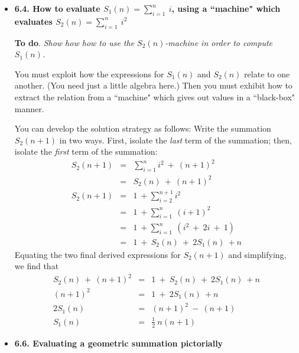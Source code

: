 \begin{itemize}
\item
{\bf 6.4. How to evaluate $S_1(n) = \sum_{i=1}^n \ i$, using a ``machine" which evaluates $S_2(n) = \sum_{i=1}^n \ i^2$}
\smallskip

{\bf To do}. {\em Show how how to use the $S_2(n)$-machine in order to compute $S_1(n)$.}

\medskip

You must exploit how the expressions for $S_1(n)$ and $S_2(n)$ relate to one another.  (You need just a little algebra here.)  Then you must exhibit how to extract the relation from a ``machine" which gives out values in a ``black-box" manner.

\smallskip

You can develop the solution strategy as follows:  
Write the summation $S_2(n+1)$ in two ways.  First, isolate the {\em last} term of the summation; then, isolate the {\em first} term of the summation:
\begin{eqnarray*}
S_2(n+1) & = &  \sum_{i=1}^{n} i^2 \ + \ (n+1)^2  \\
                & = & S_2(n) \ + \ (n+1)^2 \\
S_2(n+1) & = & 1 \ + \sum_{i=2}^{n+1} i^2 \\
                & = & 1 \ + \sum_{i=1}^{n} \ (i+1)^2 \\
                & = & 1 \ + \sum_{i=1}^{n} \ (i^2 \ + \ 2 i \ + \ 1) \\
                & = & 1 \ + \ S_2(n) \ + \ 2 S_1(n) \ + n
\end{eqnarray*} 
Equating the two final derived expressions for $S_2(n+1)$ and simplifying, we find that
\begin{eqnarray*}
 S_2(n) \ + \ (n+1)^2 & = & 1 \ + \ S_2(n) \ + \ 2 S_1(n) \ + n \\
                    (n+1)^2 & = & 1 \ + \ 2 S_1(n) \ + n \\
                  2 S_1(n) & = & (n+1)^2 \ - \ (n + 1) \\
                     S_1(n) & =  & \frac{1}{2} \ n(n+1) 
\end{eqnarray*} 

\medskip
\item
{\bf 6.6. Evaluating a geometric summation pictorially}

\smallskip



\end{itemize}
